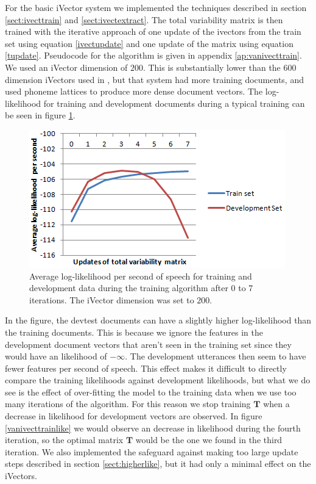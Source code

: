 For the basic iVector system we implemented the techniques described in section \ref{sect:ivecttrain} and \ref{sect:ivectextract}. The total variability matrix is then trained with the iterative approach of one update of the ivectors from the train set using equation \ref{ivectupdate} and one update of the matrix using equation \ref{tupdate}. Pseudocode for the algorithm is given in appendix \ref{ap:vanivecttrain}. We used an iVector dimension of $200$. This is substantially lower than the $600$ dimension iVectors used in \cite{lrivector}, but that system had more training documents, and used phoneme lattices to produce more dense document vectors. The log-likelihood for training and development documents during a typical training can be seen in figure \ref{fig:vanivecttrainlike}. 
\begin{figure}[hbt]
	\begin{center}
	\includegraphics{figures/vanivecttrainlike.png}
	\caption{Average log-likelihood per second of speech for training and development data during the training algorithm after 0 to 7 iterations. The iVector dimension was set to $200$.}
	\label{fig:vanivecttrainlike}
	\end{center}
\end{figure}
In the figure, the devtest documents can have a slightly higher log-likelihood than the training documents. This is because we ignore the features in the development document vectors that aren't seen in the training set since they would have an likelihood of $-\infty$. The development utterances then seem to have fewer features per second of speech. This effect makes it difficult to directly compare the training likelihoods against development likelihoods, but what we do see is the effect of over-fitting the model to the training data when we use too many iterations of the algorithm. For this reason we stop training $\mathbf{T}$ when a decrease in likelihood for development vectors are observed. In figure \ref{vanivecttrainlike} we would observe an decrease in likelihood during the fourth iteration, so the optimal matrix $\mathbf{T}$ would be the one we found in the third iteration. We also implemented the safeguard against making too large update steps described in section \ref{sect:higherlike}, but it had only a minimal effect on the iVectors.

